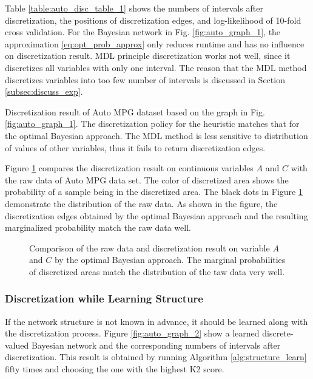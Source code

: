 Table \ref{table:auto_disc_table_1} shows the numbers of intervals after discretization, the positions of discretization edges, and log-likelihood of 10-fold cross validation. For the Bayesian network in Fig. \ref{fig:auto_graph_1}, the approximation \ref{eq:opt_prob_approx} only reduces runtime and has no influence on discretization result. MDL principle discretization works not well, since it discretizes all variables with only one interval. The reason that the MDL method discretizes variables into too few number of intervals is discussed in Section \ref{subsec:discuss_exp}.

\begin{table}[h]
  \centering
  \caption{Discretization result of Auto MPG dataset based on the graph in Fig. \ref{fig:auto_graph_1}. The discretization policy for the heuristic matches that for the optimal Bayesian approach. The MDL method is less sensitive to distribution of values of other variables, thus it fails to return discretization edges.}
  
  \label{table:auto_disc_table_1}
\end{table}

Figure \ref{fig:auto_exp1_distr_1_3} compares the discretization result on continuous variables $A$ and $C$ with the raw data of Auto MPG data set. The color of discretized area shows the probability of a sample being in the discretized area. The black dots in Figure \ref{fig:auto_exp1_distr_1_3} demonstrate the distribution of the raw data. As shown in the figure, the discretization edges obtained by the optimal Bayesian approach and the resulting marginalized probability match the raw data well.

\begin{figure}[ht]
      
  \caption{Comparison of the raw data and discretization result on variable $A$ and $C$ by the optimal Bayesian approach. The marginal probabilities of discretized areas match the distribution of the taw data very well.}
  \label{fig:auto_exp1_distr_1_3}
\end{figure}

\subsubsection{Discretization while Learning Structure}
\label{subsubsec:auto_exp2}

If the network structure is not known in advance, it should be learned along with the discretization process. Figure \ref{fig:auto_graph_2} show a learned discrete-valued Bayesian network and the corresponding numbers of intervals after discretization. This result is obtained by running Algorithm \ref{alg:structure_learn} fifty times and choosing the one with the highest K2 score.


